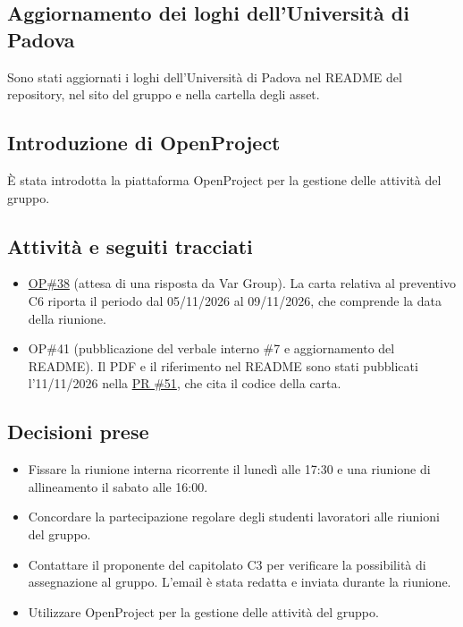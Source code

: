 \documentclass[a4paper, 11pt]{article}
\begin{document}
\subsection{Aggiornamento dei loghi dell'Università di Padova}
Sono stati aggiornati i loghi dell'Università di Padova nel README del repository, nel sito del gruppo e nella cartella degli asset.

\subsection{Introduzione di OpenProject}
È stata introdotta la piattaforma OpenProject per la gestione delle attività del gruppo.

\subsection{Attività e seguiti tracciati}
\begin{itemize}
    \item \href{https://openproject.tail1be59a.ts.net/work_packages/38}{OP\#38} (attesa di una risposta da Var Group). La carta relativa al preventivo C6 riporta il periodo dal 05/11/2026 al 09/11/2026, che comprende la data della riunione.
    \item OP\#41 (pubblicazione del verbale interno \#7 e aggiornamento del README). Il PDF e il riferimento nel README sono stati pubblicati l'11/11/2026 nella \href{https://github.com/BitCrusher-Team/Progetto_SWE_26-27/pull/51}{PR \#51}, che cita il codice della carta.
\end{itemize}

\subsection{Decisioni prese}
\begin{itemize}
    \item Fissare la riunione interna ricorrente il lunedì alle 17:30 e una riunione di allineamento il sabato alle 16:00.
    \item Concordare la partecipazione regolare degli studenti lavoratori alle riunioni del gruppo.
    \item Contattare il proponente del capitolato C3 per verificare la possibilità di assegnazione al gruppo. L’email è stata redatta e inviata durante la riunione.
    \item Utilizzare OpenProject per la gestione delle attività del gruppo.
\end{itemize}
\end{document}
